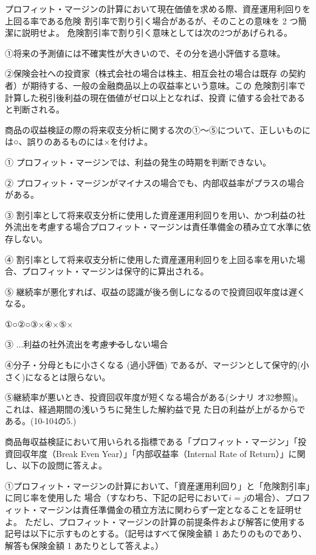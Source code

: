 \documentclass[report,gutter=10mm,fore-edge=10mm,uplatex,dvipdfmx]{jlreq}
\begin{document}
プロフィット・マージンの計算において現在価値を求める際、資産運用利回りを上回る率である危険
割引率で割り引く場合があるが、そのことの意味を 2 つ簡潔に説明せよ。
\answer{}
危険割引率で割り引く意味としては次の2つがあげられる。

①将来の予測値には不確実性が大きいので、その分を過小評価する意味。

②保険会社への投資家（株式会社の場合は株主、相互会社の場合は既存
の契約者）が期待する、一般の金融商品以上の収益率という意味。この
危険割引率で計算した税引後利益の現在価値がゼロ以上となれば、投資
に値する会社であると判断される。

商品の収益検証の際の将来収支分析に関する次の①～⑤について、正しいものには○、誤りのあるものには×を付けよ。

① プロフィット・マージンでは、利益の発生の時期を判断できない。

② プロフィット・マージンがマイナスの場合でも、内部収益率がプラスの場合がある。

③ 割引率として将来収支分析に使用した資産運用利回りを用い、かつ利益の社外流出を考慮する場合プロフィット・マージンは責任準備金の積み立て水準に依存しない。

④ 割引率として将来収支分析に使用した資産運用利回りを上回る率を用いた場合、プロフィット・マージンは保守的に算出される。

⑤ 継続率が悪化すれば、収益の認識が後ろ倒しになるので投資回収年度は遅くなる。

\answer{}
①○②○③×④×⑤×

③ ...利益の社外流出を考慮\sout{する}しない場合

④分子・分母ともに小さくなる (過小評価) であるが、マージンとして保守的(小さく)になるとは限らない。

⑤継続率が悪いとき、投資回収年度が短くなる場合がある(シナリ
オ32参照)。これは、経過期間の浅いうちに発生した解約益で見
た日の利益が上がるからである。(10-104の5.)

商品毎収益検証において用いられる指標である「プロフィット・マージン」「投資回収年度（Break
Even Year）」「内部収益率（Internal Rate of Return）」に関し、以下の設問に答えよ。

①プロフィット・マージンの計算において、「資産運用利回り」と「危険割引率」に同じ率を使用した
場合（すなわち、下記の記号において$i=j$の場合）、プロフィット・マージンは責任準備金の積立方法に関わらず一定となることを証明せよ。
ただし、プロフィット・マージンの計算の前提条件および解答に使用する記号は以下に示すものとする。（記号はすべて保険金額 1 あたりのものであり、解答も保険金額 1 あたりとして答えよ。）
\end{document}
